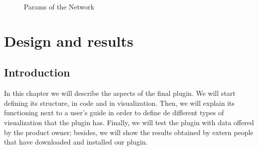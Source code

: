 \documentclass[a4paper, 12pt]{book}
\begin{document}
\begin{figure}[H]
 \centering
 \caption{Params of the Network}
 \label{f:paramsnetwork}
\end{figure}
 
\cleardoublepage
\chapter{Design and results}
\label{chap:dai}

\section{Introduction}
\label{sec:dint}

In this chapter we will describe the aspects of the final plugin. We will start defining its structure, in code and in visualization. Then, we will explain its functioning next to a user's guide in order to define de different types of visualization that the plugin has. Finally, we will test the plugin with data offered by the product owner; besides, we will show the results obtained by extern people that have downloaded and installed our plugin. 
\end{document}
